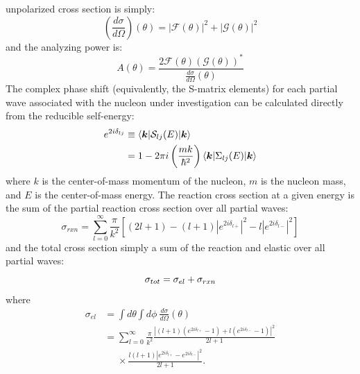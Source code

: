 unpolarized cross section is simply:
\begin{equation}
    \left(\frac{d\sigma}{d\Omega}\right)(\theta) = |\mathcal{F}(\theta)|^{2}
    +|\mathcal{G}(\theta)|^{2}
\end{equation}
and the analyzing power is:
\begin{equation}
    A(\theta) = \frac{2\mathcal{F}(\theta)(\mathcal{G}(\theta))^{*}}
    {\frac{d\sigma}{d\Omega}(\theta)}
\end{equation}
The complex phase shift (equivalently, the S-matrix elements) for each partial wave associated
with the nucleon under investigation can be
calculated directly from the reducible self-energy:
\begin{equation}
    \begin{split}
        e^{2i\delta_{lj}} & \equiv \braket{\bm{k}|\mathcal{S}_{lj}(E)|\bm{k}}\\
        & = 1 - 2\pi i \left(\frac{mk}{\hbar^{2}}\right) \braket{\bm{k}|\Sigma_{lj}(E)|\bm{k}}
    \end{split}
\end{equation}
where $k$ is the center-of-mass momentum of the nucleon, $m$ is the nucleon mass, and $E$ is the
center-of-mass energy. The reaction cross section at a given energy is the sum of the partial
reaction cross section over all partial waves:
\begin{equation}
    \sigma_{rxn} = \sum^{\infty}_{l=0}\frac{\pi}{k^{2}}
    \left[(2l+1)-(l+1)|e^{2i\delta_{l+}}|^{2}-l|e^{2i\delta_{l-}}|^{2}\right]
\end{equation}
and the total cross section simply a sum of the reaction and elastic over all partial waves:
\begin{equation}
    \sigma_{tot} = \sigma_{el} + \sigma_{rxn}\\
\end{equation}
where
\begin{equation}
    \begin{split}
        \sigma_{el} & = \int d\theta \int d\phi\ \frac{d\sigma}{d\Omega}(\theta)\\
        & = \sum^{\infty}_{l=0}\frac{\pi}{k^{2}}
        \frac{|(l+1)(e^{2i\delta_{l+}}-1)+l(e^{2i\delta_{l-}}-1)|^{2}}{2l+1}\\
        & \phantom{ {}= } \times
        \frac{l(l+1)|e^{2i\delta_{l+}}-e^{2i\delta_{l-}}|^{2}}{2l+1}.
    \end{split}
\end{equation}

